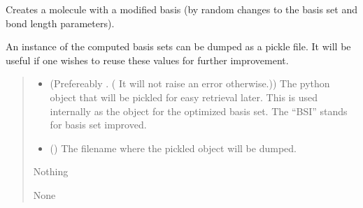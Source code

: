 \documentclass[letterpaper,10pt,english]{sphinxmanual}
\begin{document}

\begin{fulllineitems}
\label{\detokenize{api:MSTOOpt.dmol}}
\pysigstartsignatures
\pysiglinewithargsret
{}
{\sphinxparamcomma {}\sphinxparamcomma {}}
{}
\pysigstopsignatures
\sphinxAtStartPar
Creates a molecule with a modified basis (by random changes to the basis set and bond length parameters).

\end{fulllineitems}


\begin{fulllineitems}
\label{\detokenize{api:MSTOOpt.dumpBSI}}
\pysigstartsignatures
\pysiglinewithargsret
{}
{\sphinxparamcomma {}}
{}
\pysigstopsignatures
\sphinxAtStartPar
An instance of the computed basis sets can be dumped as a pickle file. It will be useful if one wishes to reuse these values for further improvement.
\begin{quote}\begin{description}
\begin{itemize}
\item {} 
\sphinxAtStartPar
{} (Prefereably {\hyperref[\detokenize{api:MSTOOpt.getEnergies}]{}}. ( It will not raise an error otherwise.)) \textendash{} The python object that will be pickled for easy retrieval later. This is used internally as the {\hyperref[\detokenize{api:MSTOOpt.getEnergies}]{}} object for the optimized basis set. The “BSI” stands for basis set improved.

\item {} 
\sphinxAtStartPar
{} () \textendash{} The filename where the pickled object will be dumped.

\end{itemize}

\sphinxAtStartPar
Nothing

\sphinxAtStartPar
None

\end{description}\end{quote}

\end{fulllineitems}
\end{document}
